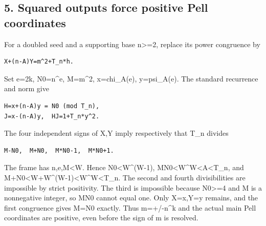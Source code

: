 \subsection*{5. Squared outputs force positive Pell coordinates}



For a doubled seed and a supporting base n\textgreater{}\allowbreak{}=\allowbreak{}2, replace its power congruence by



\begin{verbatim}
X+(n-A)Y=m^2+T_n*h.
\end{verbatim}

Set e=\allowbreak{}2k, N0=\allowbreak{}n\textasciicircum{}\allowbreak{}e, M=\allowbreak{}m\textasciicircum{}\allowbreak{}2, x=\allowbreak{}chi\_\allowbreak{}A(e), y=\allowbreak{}psi\_\allowbreak{}A(e). The standard recurrence and norm give



\begin{verbatim}
H=x+(n-A)y = N0 (mod T_n),
J=x-(n-A)y,  HJ=1+T_n*y^2.
\end{verbatim}

The four independent signs of X,Y imply respectively that T\_\allowbreak{}n divides



\begin{verbatim}
M-N0,  M+N0,  M*N0-1,  M*N0+1.
\end{verbatim}

The frame has n,e,M\textless{}\allowbreak{}W. Hence N0\textless{}\allowbreak{}W\textasciicircum{}\allowbreak{}(W-1), M\textasteriskcentered{}\allowbreak{}N0\textless{}\allowbreak{}W\textasciicircum{}\allowbreak{}W\textless{}\allowbreak{}A\textless{}\allowbreak{}T\_\allowbreak{}n, and M+\allowbreak{}N0\textless{}\allowbreak{}W+\allowbreak{}W\textasciicircum{}\allowbreak{}(W-1)\textless{}\allowbreak{}W\textasciicircum{}\allowbreak{}W\textless{}\allowbreak{}T\_\allowbreak{}n. The second and fourth divisibilities are impossible by strict positivity. The third is impossible because N0\textgreater{}\allowbreak{}=\allowbreak{}4 and M is a nonnegative integer, so M\textasteriskcentered{}\allowbreak{}N0 cannot equal one. Only X=\allowbreak{}x,Y=\allowbreak{}y remains, and the first congruence gives M=\allowbreak{}N0 exactly. Thus m=\allowbreak{}+\allowbreak{}/\allowbreak{}-n\textasciicircum{}\allowbreak{}k and the actual main Pell coordinates are positive, even before the sign of m is resolved.



